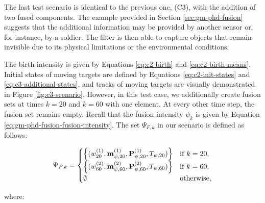 The last test scenario is identical to the previous one, (C3), with the addition of two fused components. The example provided in Section \ref{sec:gm-phd-fusion} suggests that the additional information may be provided by another sensor or, for instance, by a soldier. The filter is then able to capture objects that remain invisible due to its physical limitations or the environmental conditions.

The birth intensity is given by Equations \ref{eq:c2-birth} and \ref{eq:c2-birth-means}. Initial states of moving targets are defined by Equations \ref{eq:c2-init-states} and \ref{eq:c3-additional-states}, and tracks of moving targets are visually demonstrated in Figure \ref{fig:c3-scenario}. However, in this test case, we additionally create fusion sets at times $k=20$ and $k=60$ with one element. At every other time step, the fusion set remains empty. Recall that the fusion intensity $\psi_k$ is given by Equation \ref{eq:gm-phd-fusion-fusion-intensity}. The set $\Psi_{F,k}$ in our scenario is defined as follows:

\begin{equation}
    \Psi_{F, k} = \begin{cases}
        \left\{ ( w_{20}^{(1)}, \svecat{m}{\psi, 20}{(1)}, \svecat{P}{\psi, 20}{(1)}, T_{\psi, 20} )\right\} & \text{if } k = 20, \\
        \left\{ ( w_{60}^{(2)}, \svecat{m}{\psi, 60}{(2)}, \svecat{P}{\psi, 60}{(2)}, T_{\psi, 60} )\right\} & \text{if } k = 60, \\
        \emptyset & \text{otherwise},
    \end{cases}
\end{equation}

\noindent where: 

